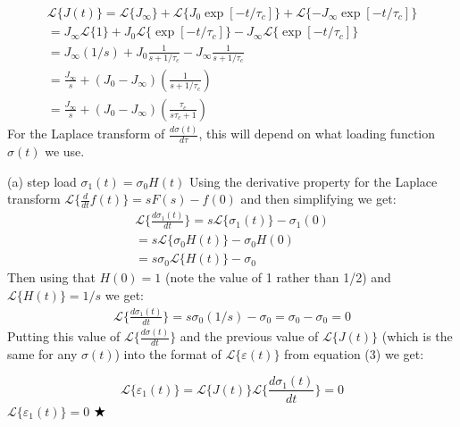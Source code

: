 \begin{equation}
\begin{split}
        \mathcal{L}\{J(t)\} = \mathcal{L}\{ J_\infty\} + \mathcal{L}\{J_0\exp[-t/\tau_c]\} + \mathcal{L}\{-J_\infty\exp[-t/\tau_c]\} \\
        = J_\infty\mathcal{L}\{ 1\} + J_0\mathcal{L}\{\exp[-t/\tau_c]\} -J_\infty\mathcal{L}\{\exp[-t/\tau_c]\} \\
        =J_\infty (1/s) + J_0 \frac{1}{s+1/\tau_c} - J_\infty \frac{1}{s+1/\tau_c} \\
        =\frac{J_\infty}{s} + (J_0-J_\infty)(\frac{1}{s+1/\tau_c}) \\
        =\frac{J_\infty}{s} + (J_0-J_\infty)(\frac{\tau_c}{s\tau_c+1})
\end{split}
\end{equation}
For the Laplace transform of $\frac{d\sigma(t)}{d\tau}$, this will depend on what loading function $\sigma(t)$ we use.

\medskip
(a) step load $\sigma_1(t) = \sigma_0 H(t)$ \newline
Using the derivative property for the Laplace transform $\mathcal{L}\{\frac{d}{dt}f(t)\} = sF(s)-f(0)$ and then simplifying we get:
\begin{equation}
\begin{split}
    \mathcal{L}\{\frac{d\sigma_1(t)}{dt}\} = s\mathcal{L}\{ \sigma_1(t)\}-\sigma_1(0) \\
    = s\mathcal{L}\{ \sigma_0H(t)\}-\sigma_0H(0) \\ 
    = s\sigma_0\mathcal{L}\{ H(t)\}-\sigma_0
\end{split}
\end{equation}
Then using that $H(0) = 1$ (note the value of 1 rather than 1/2) and $\mathcal{L}\{ H(t)\}=1/s$ we get:
\begin{equation}
\begin{split}
    \mathcal{L}\{\frac{d\sigma_1(t)}{dt}\} = s\sigma_0(1/s)-\sigma_0 = \sigma_0 - \sigma_0 = 0
\end{split}
\end{equation}
Putting this value of $\mathcal{L}\{\frac{d\sigma(t)}{dt}\}$ and the previous value of $\mathcal{L}\{J(t)\}$ (which is the same for any $\sigma(t)$) into the format of $\mathcal{L}\{\varepsilon(t)\}$ from equation (3) we get:

\begin{equation}
    \mathcal{L}\{\varepsilon_1(t)\} = \mathcal{L}\{J(t)\} \mathcal{L}\{\frac{d\sigma_1(t)}{dt}\} = 0
\end{equation}
\hspace*{\fill} $\mathcal{L}\{\varepsilon_1(t)\} = 0$ $\space \bigstar$

